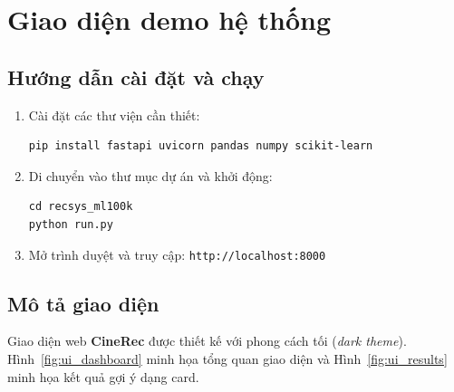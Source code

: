 \documentclass[../BTL.tex]{subfiles}
\begin{document}
\section{Giao diện demo hệ thống}
\label{section:3.9}

\subsection{Hướng dẫn cài đặt và chạy}
\label{section:3.9.1}

\begin{enumerate}[itemsep=0.3em]
    \item Cài đặt các thư viện cần thiết:
\begin{lstlisting}[style=bash, float=false]
pip install fastapi uvicorn pandas numpy scikit-learn
\end{lstlisting}

    \item Di chuyển vào thư mục dự án và khởi động:
\begin{lstlisting}[style=bash, float=false]
cd recsys_ml100k
python run.py
\end{lstlisting}

    \item Mở trình duyệt và truy cập:
    \texttt{http://localhost:8000}
\end{enumerate}

\subsection{Mô tả giao diện}
\label{section:3.9.2}

Giao diện web \textbf{CineRec} được thiết kế với phong cách tối
(\textit{dark theme}). Hình~\ref{fig:ui_dashboard} minh họa tổng quan giao
diện và Hình~\ref{fig:ui_results} minh họa kết quả gợi ý dạng card.
\end{document}
